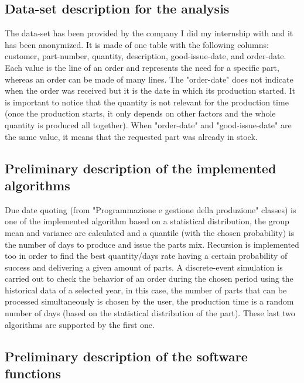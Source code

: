 \documentclass[a4paper,12pt]{article}
\begin{document}
\subsection{Data-set description for the analysis}

The data-set has been provided by the company I did my internship with and it has been anonymized. It is made of one table with the following columns: customer, part-number, quantity, description, good-issue-date, and order-date. Each value is the line of an order and represents the need for a specific part, whereas an order can be made of many lines. The "order-date" does not indicate when the order was received but it is the date in which its production started. It is important to notice that the quantity is not relevant for the production time (once the production starts, it only depends on other factors and the whole quantity is produced all together). When "order-date" and "good-issue-date" are the same value, it means that the requested part was already in stock.

\subsection{Preliminary description of the implemented algorithms}

Due date quoting (from "Programmazione e gestione della produzione" classes) is one of the implemented algorithm based on a statistical distribution, the group mean and variance are calculated and a quantile (with the chosen probability) is the number of days to produce and issue the parts mix. Recursion is implemented too in order to find the best quantity/days rate having a certain probability of success and delivering a given amount of parts. A discrete-event simulation is carried out to check the behavior of an order during the chosen period using the historical data of a selected year, in this case, the number of parts that can be processed simultaneously is chosen by the user, the production time is a random number of days (based on the statistical distribution of the part). These last two algorithms are supported by the first one.

\subsection{Preliminary description of the software functions} 
\end{document}
